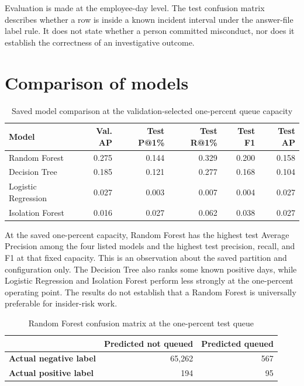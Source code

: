 \documentclass[12pt,a4paper,oneside]{report}
\newcommand{\tablefont}{\small}
\begin{document}
Evaluation is made at the employee-day level. The test confusion
matrix describes whether a row is inside a known incident interval
under the answer-file label rule. It does not state whether a person
committed misconduct, nor does it establish the correctness of an
investigative outcome.

\section{Comparison of models}
\begin{table}[H]
\centering
\tablefont
\caption{Saved model comparison at the validation-selected one-percent queue capacity}
\label{tab:model-results}
\begin{tabularx}{\textwidth}{|p{}|R|R|R|R|R|}
\hline
\textbf{Model} & \textbf{Val. AP} & \textbf{Test P@1\%} & \textbf{Test R@1\%} & \textbf{Test F1} & \textbf{Test AP}\\\hline
Random Forest & 0.275 & 0.144 & 0.329 & 0.200 & 0.158\\\hline
Decision Tree & 0.185 & 0.121 & 0.277 & 0.168 & 0.104\\\hline
Logistic Regression & 0.027 & 0.003 & 0.007 & 0.004 & 0.027\\\hline
Isolation Forest & 0.016 & 0.027 & 0.062 & 0.038 & 0.027\\\hline
\end{tabularx}
\end{table}

At the saved one-percent capacity, Random Forest has the highest test
Average Precision among the four listed models and the highest test
precision, recall, and F1 at that fixed capacity. This is an
observation about the saved partition and configuration only. The
Decision Tree also ranks some known positive days, while Logistic
Regression and Isolation Forest perform less strongly at the
one-percent operating point. The results do not establish that a
Random Forest is universally preferable for insider-risk work.

\begin{table}[H]
\centering
\tablefont
\caption{Random Forest confusion matrix at the one-percent test queue}
\label{tab:rf-confusion}
\begin{tabularx}{0.8\textwidth}{|p{}|R|R|}
\hline
 & \textbf{Predicted not queued} & \textbf{Predicted queued}\\\hline
\textbf{Actual negative label} & 65,262 & 567\\\hline
\textbf{Actual positive label} & 194 & 95\\\hline
\end{tabularx}
\end{table}
\end{document}
